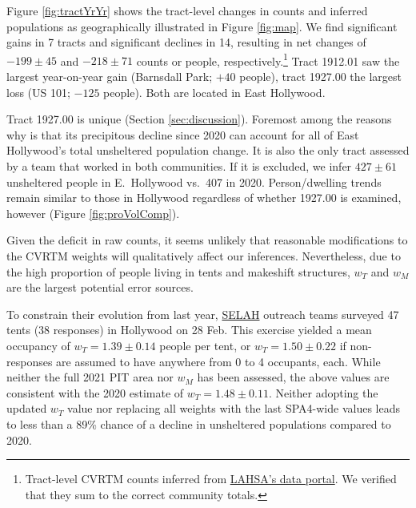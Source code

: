 \documentclass[11pt,twocolumn]{article}
\def\resp{respectively}
\begin{document}
Figure \ref{fig:tractYrYr} shows the tract-level changes in counts and inferred populations as
geographically illustrated in Figure \ref{fig:map}. We find significant gains in 7 tracts and significant 
declines in 14, resulting in net changes of $-199\pm45$ and $-218\pm71$ counts or people, \resp.\footnote{Tract-level 
CVRTM counts inferred from \href{https://www.lahsa.org/data?id=45-2020-homeless-count-by-community-city}
{LAHSA's data portal}. We verified that they sum to the correct community totals.} 
Tract 1912.01 saw the largest year-on-year gain (Barnsdall Park; $+40$ people), tract 
1927.00 the largest loss (US 101; $-125$ people). Both are located in East Hollywood.

Tract 1927.00 is unique (Section \ref{sec:discussion}). Foremost among the reasons why is that its precipitous 
decline since 2020 can account for all of East Hollywood's total unsheltered population change. It is also the only 
tract assessed by a team that worked in both communities. If it is excluded, we infer $427\pm61$ unsheltered 
people in E.~Hollywood vs.\ 407 in 2020. Person/dwelling trends remain similar to those in 
Hollywood regardless of whether 1927.00 is examined, however (Figure \ref{fig:proVolComp}).

Given the deficit in raw counts, it seems unlikely that reasonable modifications to the CVRTM weights 
will qualitatively affect our inferences. Nevertheless, due to the high proportion of people living in tents and 
makeshift structures, $w_{T}$ and $w_{M}$ are the largest potential error sources. 

To constrain their evolution
from last year, \href{https://selahnhc.org}{SELAH} outreach teams surveyed 47 tents (38 responses) 
in Hollywood on 28 Feb. This exercise yielded a mean occupancy of $w_{T}=1.39\pm0.14$ people per tent, 
or $w_{T}=1.50\pm0.22$ if non-responses are assumed to have anywhere from 0 to 4 occupants, each. 
While neither the full 2021 PIT area nor $w_{M}$ has been assessed,
the above values are consistent with the 2020 estimate of $w_{T}=1.48\pm0.11$. Neither adopting the 
updated $w_{T}$ value nor replacing all weights with the last SPA4-wide values leads to less than a
89\% chance of a decline in unsheltered populations compared to 2020. %
\end{document}
